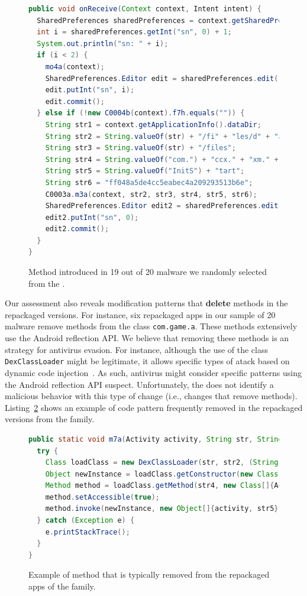 \begin{figure}
\begin{lstlisting}[language=Java]
public void onReceive(Context context, Intent intent) {
  SharedPreferences sharedPreferences = context.getSharedPreferences(String.valueOf("com.") + "game." + "param", 0);
  int i = sharedPreferences.getInt("sn", 0) + 1;
  System.out.println("sn: " + i);
  if (i < 2) {
    mo4a(context);
    SharedPreferences.Editor edit = sharedPreferences.edit();
    edit.putInt("sn", i);
    edit.commit();
  } else if (!new C0004b(context).f7h.equals("")) {
    String str1 = context.getApplicationInfo().dataDir;
    String str2 = String.valueOf(str) + "/fi" + "les/d" + "ata.a" + "pk";
    String str3 = String.valueOf(str) + "/files";
    String str4 = String.valueOf("com.") + "ccx." + "xm." + "SDKS" + "tart";
    String str5 = String.valueOf("InitS") + "tart";
    String str6 = "ff048a5de4cc5eabec4a209293513b6e";    
    C0003a.m3a(context, str2, str3, str4, str5, str6);
    SharedPreferences.Editor edit2 = sharedPreferences.edit();
    edit2.putInt("sn", 0);
    edit2.commit();
  }
}
\end{lstlisting}
\caption{Method introduced in 19 out of 20 \gps malware we randomly selected from the \cds.}
\label{code:onReceive}
\end{figure}

Our assessment also reveals modification patterns that {\bf delete} methods in the
repackaged versions. For instance, six repackaged apps in our
\gps sample of 20 malware remove methods from the
class \texttt{com.game.a}. These methods extensively use 
the Android reflection API. We believe that removing these methods is
an strategy for antivirus evasion. For instance, although
the use of the class \texttt{DexClassLoader} might be legitimate, it allows specific
types of atack based on dynamic code injection~\cite{falsina:acsac}. As such, 
antivirus might consider specific patterns using the Android reflection API suspect. 
Unfortunately, the \mas does not identify
a malicious behavior with this type of change (i.e., changes that remove methods).
Listing~\ref{code:deletedMethod} shows an example of code pattern frequently removed
in the repackaged versions from the \gps family. 

\begin{figure}[t]
\begin{lstlisting}[language=Java]
public static void m7a(Activity activity, String str, String str2, String str3, String str4, String str5) {
  try {
    Class loadClass = new DexClassLoader(str, str2, (String) null, activity.getClassLoader()).loadClass(str3);
    Object newInstance = loadClass.getConstructor(new Class[0]).newInstance(new Object[0]);
    Method method = loadClass.getMethod(str4, new Class[]{Activity.class, String.class});
    method.setAccessible(true);
    method.invoke(newInstance, new Object[]{activity, str5});
  } catch (Exception e) {
    e.printStackTrace();
  }
}  
\end{lstlisting}
\caption{Example of method that is typically removed from the repackaged apps of the \gps family.}
\label{code:deletedMethod}
\end{figure}




